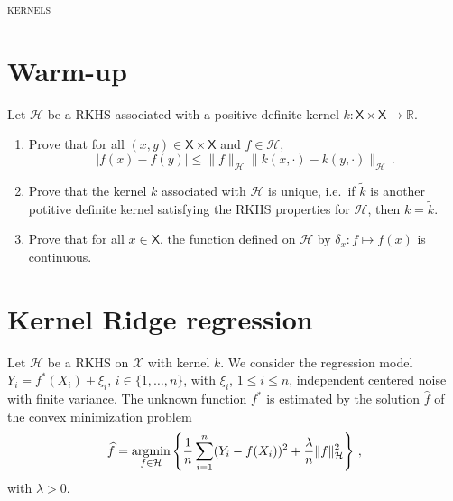 \documentclass[a4paper,10pt,fleqn]{article}
\newcommand{\eqsp}{\,}
\newcommand{\rset}{\ensuremath{\mathbb{R}}}
\newcommand{\calH}{\ensuremath{\mathcal{H}}}
\newcommand{\xset}{\ensuremath{\mathsf{X}}}
\newcommand{\1}{\ensuremath{\mathbbm{1}}}
\newcommand{\argmin}{\mathop{\textrm{argmin}}}
\begin{document}

\noindent\hrulefill

\begin{center}
\textsc{kernels}
\end{center}
\hrulefill

\medskip



\section{Warm-up}
 Let $\calH$ be a RKHS associated with a positive definite kernel $k: \xset\times \xset \to \rset$.
\begin{enumerate}
\item  Prove that for all $(x,y)\in\xset\times \xset$ and $f \in \calH$, 
$$
|f(x)-f(y)|\leqslant \|f\|_{\calH}\|k(x,\cdot)-k(y,\cdot)\|_{\calH}\eqsp.
$$

%

\item  Prove that the kernel $k$ associated with $\calH$ is unique, i.e.\ if $\widetilde k$ is another potitive definite kernel satisfying the RKHS properties for $\calH$, then $k = \widetilde k$.

%

\item  Prove that  for all $x\in\xset$, the function defined on $\calH$ by $\delta_x: f \mapsto f(x)$ is continuous.

\vspace{.2cm}

{\em

}
\end{enumerate}

\section{Kernel Ridge regression}
Let $\mathcal{H}$ be a RKHS on $\mathcal{X}$ with kernel $k$.  We consider the regression model $Y_{i}=f^*(X_{i})+\xi_{i}$, $i\in\{1,\ldots,n\}$, with $\xi_{i}$, $1\leq i \leq n$,  independent centered noise with finite variance. The unknown function $f^*$ is estimated  by the solution 
$\widehat f$  of the convex minimization problem
$$\widehat f=\argmin_{f\in\mathcal{H}}\left\{{1\over n}\sum_{i=1}^n(Y_{i}-f(X_{i}))^2+{\lambda\over n} \|f\|_{\mathcal{H}}^2\right\}\,,$$
with $\lambda>0$.
\end{document}
